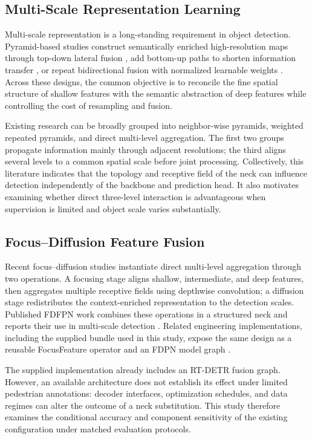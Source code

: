 \documentclass[journal]{IEEEtran}
\begin{document}
\subsection{Multi-Scale Representation Learning}
Multi-scale representation is a long-standing requirement in object detection. Pyramid-based studies construct semantically enriched high-resolution maps through top-down lateral fusion \cite{lin2017fpn}, add bottom-up paths to shorten information transfer \cite{liu2018panet}, or repeat bidirectional fusion with normalized learnable weights \cite{tan2020efficientdet}. Across these designs, the common objective is to reconcile the fine spatial structure of shallow features with the semantic abstraction of deep features while controlling the cost of resampling and fusion.

Existing research can be broadly grouped into neighbor-wise pyramids, weighted repeated pyramids, and direct multi-level aggregation. The first two groups propagate information mainly through adjacent resolutions; the third aligns several levels to a common spatial scale before joint processing. Collectively, this literature indicates that the topology and receptive field of the neck can influence detection independently of the backbone and prediction head. It also motivates examining whether direct three-level interaction is advantageous when supervision is limited and object scale varies substantially.

\subsection{Focus--Diffusion Feature Fusion}
Recent focus--diffusion studies instantiate direct multi-level aggregation through two operations. A focusing stage aligns shallow, intermediate, and deep features, then aggregates multiple receptive fields using depthwise convolution; a diffusion stage redistributes the context-enriched representation to the detection scales. Published FDFPN work combines these operations in a structured neck and reports their use in multi-scale detection \cite{luo2026fdfpn}. Related engineering implementations, including the supplied bundle used in this study, expose the same design as a reusable FocusFeature operator and an FDPN model graph \cite{modulebundle2026}.

The supplied implementation already includes an RT-DETR fusion graph. However, an available architecture does not establish its effect under limited pedestrian annotations: decoder interfaces, optimization schedules, and data regimes can alter the outcome of a neck substitution. This study therefore examines the conditional accuracy and component sensitivity of the existing configuration under matched evaluation protocols.
\end{document}
